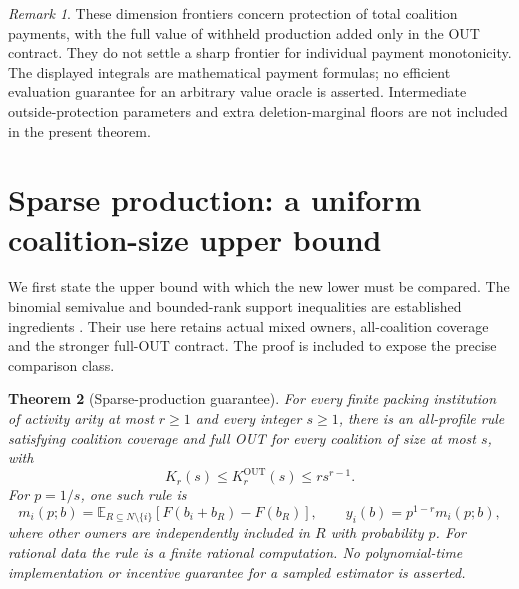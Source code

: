 \documentclass[11pt]{article}
\newtheorem{theorem}{Theorem}[section]
\theoremstyle{definition}\newtheorem{definition}[theorem]{Definition}
\theoremstyle{remark}\newtheorem{remark}[theorem]{Remark}
\begin{document}
\begin{remark}\label{dim:scope}
These dimension frontiers concern protection of total coalition payments,
with the full value of withheld production added only in the OUT contract.
They do not settle a sharp frontier for individual payment monotonicity.
The displayed integrals are mathematical payment formulas; no efficient
evaluation guarantee for an arbitrary value oracle is asserted. Intermediate
outside-protection parameters and extra deletion-marginal floors are not
included in the present theorem.
\end{remark}

\section{Sparse production: a uniform coalition-size upper bound}\label{sec:upper}
We first state the upper bound with which the new lower must be compared.
The binomial semivalue and bounded-rank support inequalities are established
ingredients \citep{FeigeEtAl2014,EzraEtAl2018,Casajus2011}. Their use here retains
actual mixed owners, all-coalition coverage and the stronger full-OUT contract.
The proof is included to expose the precise comparison class.

\begin{theorem}[Sparse-production guarantee]\label{thm:sparse-upper}
For every finite packing institution of activity arity at most $r\ge1$ and
every integer $s\ge1$, there is an all-profile rule satisfying coalition
coverage and full OUT for every coalition of size at most $s$, with
\begin{equation}\label{eq:sparse-upper}
 K_r(s)\le K_r^{\mathrm{OUT}}(s)\le r s^{r-1}.
\end{equation}
For $p=1/s$, one such rule is
\begin{equation}\label{eq:semivalue}
 m_i(p;b)=\mathbb E_{R\subseteq N\setminus\{i\}}
       [F(b_i+b_R)-F(b_R)],\qquad y_i(b)=p^{1-r}m_i(p;b),
\end{equation}
where other owners are independently included in $R$ with probability $p$.
For rational data the rule is a finite rational computation. No
polynomial-time implementation or incentive guarantee for a sampled estimator
is asserted.
\end{theorem}
\end{document}
